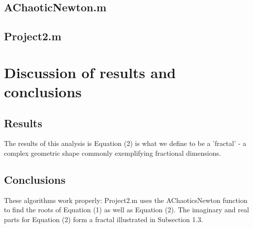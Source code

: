 \documentclass[12pt]{article} %
\begin{document}
\subsection{AChaoticNewton.m}

\hfill\newpage
\subsection{Project2.m}


\section{Discussion of results and conclusions}
  \subsection{Results}
  The results of this analysis is Equation (2) is what we define to be a 'fractal' - a complex geometric shape commonly exemplifying fractional dimensions.  
  \subsection{Conclusions}
  These algorithms work properly: Project2.m uses the AChaoticsNewton function to find the roots of Equation (1) as well as Equation (2).  The imaginary and real parts for Equation (2) form a fractal illustrated in Subsection 1.3.
\end{document}
